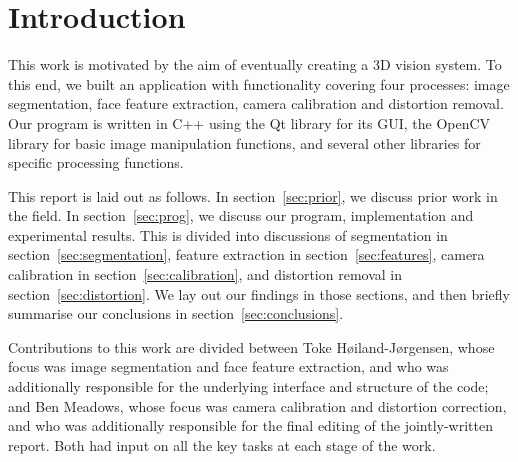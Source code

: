 
\section{Introduction}

This work is motivated by the aim of eventually creating a 3D vision system. To this end, we built an application with functionality covering four processes: image segmentation, face feature extraction, camera calibration and distortion removal. Our program is written in C++ using the Qt library for its GUI, the OpenCV library for basic image manipulation functions, and several other libraries for specific processing functions.

This report is laid out as follows. In section~\ref{sec:prior}, we discuss prior work in the field. In section~\ref{sec:prog}, we discuss our program, implementation and experimental results. This is divided into discussions of segmentation in section~\ref{sec:segmentation}, feature extraction in section~\ref{sec:features}, camera calibration in section~\ref{sec:calibration}, and distortion removal in section~\ref{sec:distortion}. We lay out our findings in those sections, and then briefly summarise our conclusions in section~\ref{sec:conclusions}.

Contributions to this work are divided between Toke Høiland-Jørgensen, whose focus was image segmentation and face feature extraction, and who was additionally responsible for the underlying interface and structure of the code; and Ben Meadows, whose focus was camera calibration and distortion correction, and who was additionally responsible for the final editing of the jointly-written report. Both had input on all the key tasks at each stage of the work.
